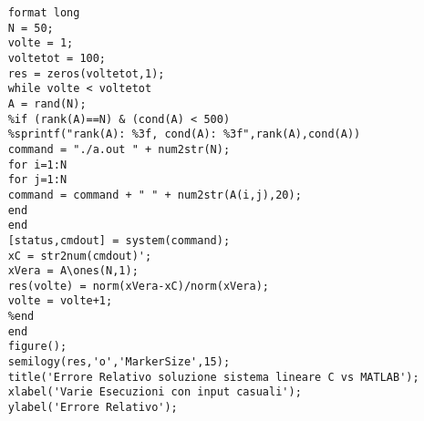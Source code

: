 \documentclass{article}
\begin{document}
	\begin{lstlisting}
	format long
	N = 50;
	volte = 1;
	voltetot = 100;
	res = zeros(voltetot,1);
	while volte < voltetot
	A = rand(N);
	%if (rank(A)==N) & (cond(A) < 500)
	%sprintf("rank(A): %3f, cond(A): %3f",rank(A),cond(A))
	command = "./a.out " + num2str(N);
	for i=1:N
	for j=1:N
	command = command + " " + num2str(A(i,j),20);
	end
	end
	[status,cmdout] = system(command);
	xC = str2num(cmdout)';
	xVera = A\ones(N,1);
	res(volte) = norm(xVera-xC)/norm(xVera);
	volte = volte+1;
	%end
	end
	figure();
	semilogy(res,'o','MarkerSize',15);
	title('Errore Relativo soluzione sistema lineare C vs MATLAB');
	xlabel('Varie Esecuzioni con input casuali');
	ylabel('Errore Relativo');
	\end{lstlisting}
	
	
\end{document}
